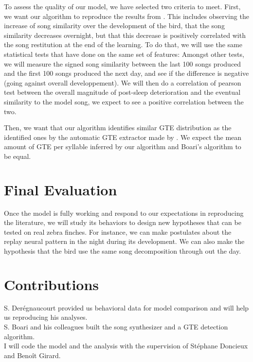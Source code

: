 \documentclass[a4paper]{article}
\begin{document}
\begin{multicols}{2}
To assess the quality of our model, we have selected two criteria to meet.
First, we want our algorithm to reproduce the results from
\textcite{deregnaucourt_how_2005}. This includes observing the increase of song
similarity \parencite{tchernichovski_procedure_2000} over the development of the
bird, that the song similarity decreases overnight, but that this decrease is
positively correlated with the song restitution at the end of the learning. To
do that, we will use the same statistical tests that
\textcite{deregnaucourt_how_2005} have done on the same set of features: Amongst
other tests, we will measure the signed song similarity between the last 100
songs produced and the first 100 songs produced the next day, and see if the
difference is negative (going against overall developpement). We will then do a
correlation of pearson test between the overall magnitude of post-sleep
deterioration and the eventual similarity to the model song, we expect to see a
positive correlation between the two.

Then, we want that our algorithm identifies similar GTE distribution as the
identified ones by the automatic GTE extractor made by
\textcite{boari_automatic_2015}. We expect the mean amount of GTE per syllable
inferred by our algorithm and Boari's algorithm to be equal.

\section*{Final Evaluation}

Once the model is fully working and respond to our expectations in reproducing
the literature, we will study its behaviors to design new hypotheses that can be
tested on real zebra finches. For instance, we can make postulates about the
replay neural pattern in the night during its development. We can also make the
hypothesis that the bird use the same song decomposition through out the day.

\section*{Contributions}

S. Derégnaucourt provided us behavioral data for model comparison and will help
us reproducing his analyses.\\
S. Boari and his colleagues built the song synthesizer and a GTE detection
algorithm.\\
I will code the model and the analysis with the supervision of Stéphane Doncieux
and Benoît Girard.\\

\printbibliography{}

\end{multicols}
\end{document}
